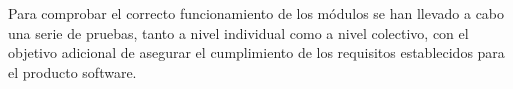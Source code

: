 Para comprobar el correcto funcionamiento de los módulos se han llevado a cabo una serie de pruebas, tanto a nivel individual como a nivel colectivo, con el objetivo adicional de asegurar el cumplimiento de los requisitos establecidos para el producto software.